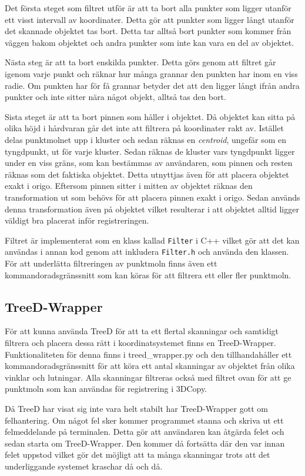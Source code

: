 \documentclass[a4paper,titlepage,12pt]{article}
\begin{document}
		Det första steget som filtret utför är att ta bort alla punkter som ligger utanför ett visst intervall av koordinater. Detta gör att punkter som ligger långt utanför det skannade objektet tas bort. Detta tar alltså bort punkter som kommer från väggen bakom objektet och andra punkter som inte kan vara en del av objektet.
		
		Nästa steg är att ta bort enskilda punkter. Detta görs genom att filtret går igenom varje punkt och räknar hur många grannar den punkten har inom en viss radie. Om punkten har för få grannar betyder det att den ligger långt ifrån andra punkter och inte sitter nära något objekt, alltså tas den bort.
		
		Sista steget är att ta bort pinnen som håller i objektet. Då objektet kan sitta på olika höjd i hårdvaran går det inte att filtrera på koordinater rakt av. Istället delas punktmolnet upp i kluster och sedan räknas en \textit{centroid}, ungefär som en tyngdpunkt, ut för varje kluster. Sedan räknas de kluster vars tyngdpunkt ligger under en viss gräns, som kan bestämmas av användaren, som pinnen och resten räknas som det faktiska objektet. Detta utnyttjas även för att placera objektet exakt i origo. Eftersom pinnen sitter i mitten av objektet räknas den transformation ut som behövs för att placera pinnen exakt i origo. Sedan används denna transformation även på objektet vilket resulterar i att objektet alltid ligger väldigt bra placerat inför registreringen.
		
		Filtret är implementerat som en klass kallad \texttt{Filter} i C++ vilket gör att det kan användas i annan kod genom att inkludera \texttt{Filter.h} och använda den klassen. För att underlätta filtreringen av punktmoln finns även ett kommandoradsgränssnitt som kan köras för att filtrera ett eller fler punktmoln.
		
	\subsection{TreeD-Wrapper}
		För att kunna använda TreeD för att ta ett flertal skanningar och samtidigt filtrera och placera dessa rätt i koordinatsystemet finns en TreeD-Wrapper. Funktionaliteten för denna finns i treed\_wrapper.py och den tillhandahåller ett kommandoradsgränssnitt för att köra ett antal skanningar av objektet från olika vinklar och lutningar. Alla skanningar filtreras också med filtret ovan för att ge punktmoln som kan användas för registrering i 3DCopy.
		
		Då TreeD har visat sig inte vara helt stabilt har TreeD-Wrapper gott om felhantering. Om något fel sker kommer programmet stanna och skriva ut ett felmeddelande på terminalen. Detta gör att användaren kan åtgärda felet och sedan starta om TreeD-Wrapper. Den kommer då fortsätta där den var innan felet uppstod vilket gör det möjligt att ta många skanningar trots att det underliggande systemet kraschar då och då.
		
\newpage
\end{document}

